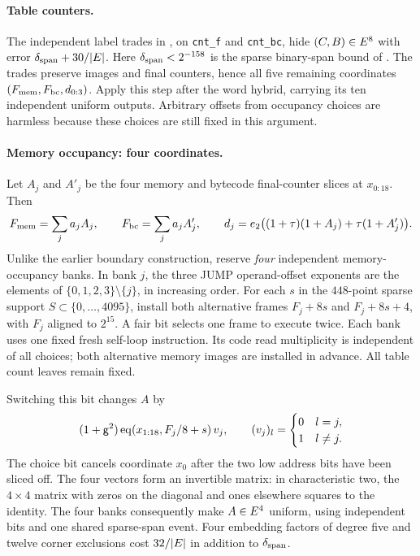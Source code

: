 \documentclass[11pt]{article}
\begin{document}
\paragraph{Table counters.} The independent label trades in , on \texttt{cnt\_f} and \texttt{cnt\_bc}, hide $(C,B)\in E^8$ with error $\delta_{\rm span}+30/|E|$. Here $\delta_{\rm span}<2^{-158}$ is the sparse binary-span bound of . The trades preserve images and final counters, hence all five remaining coordinates $(F_{\rm mem},F_{\rm bc},d_{0:3})$. Apply this step after the word hybrid, carrying its ten independent uniform outputs. Arbitrary offsets from occupancy choices are harmless because these choices are still fixed in this argument.

\paragraph{Memory occupancy: four coordinates.} Let $A_j$ and $A'_j$ be the four memory and bytecode final-counter slices at $x_{0:18}$. Then
\[
 F_{\rm mem}=\sum_j a_jA_j,\qquad F_{\rm bc}=\sum_j a_jA'_j,
 \qquad d_j=e_2\bigl((1+\tau)(1+A_j)+\tau(1+A'_j)\bigr).
\]
Unlike the earlier boundary construction, reserve \emph{four} independent memory-occupancy banks. In bank $j$, the three JUMP operand-offset exponents are the elements of $\{0,1,2,3\}\setminus\{j\}$, in increasing order. For each $s$ in the $448$-point sparse support $S\subset\{0,\ldots,4095\}$, install both alternative frames $F_j+8s$ and $F_j+8s+4$, with $F_j$ aligned to $2^{15}$. A fair bit selects one frame to execute twice. Each bank uses one fixed fresh self-loop instruction. Its code read multiplicity is independent of all choices; both alternative memory images are installed in advance. All table count leaves remain fixed.

Switching this bit changes $A$ by
\[
 (1+\mathsf{g}^2)\operatorname{eq}(x_{1:18},F_j/8+s)\,v_j,
 \qquad (v_j)_l=\begin{cases}0&l=j,\\1&l\ne j.\end{cases}
\]
The choice bit cancels coordinate $x_0$ after the two low address bits have been sliced off. The four vectors form an invertible matrix: in characteristic two, the $4\times4$ matrix with zeros on the diagonal and ones elsewhere squares to the identity. The four banks consequently make $A\in E^4$ uniform, using independent bits and one shared sparse-span event. Four embedding factors of degree five and twelve corner exclusions cost $32/|E|$ in addition to $\delta_{\rm span}$.
\end{document}
